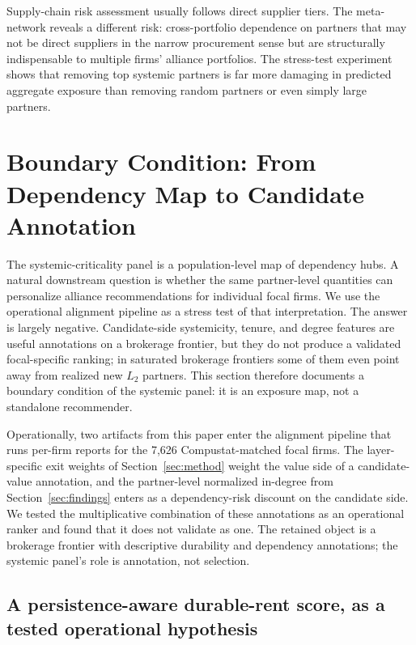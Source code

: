 \documentclass[11pt,letterpaper]{article}
\begin{document}
Supply-chain risk assessment usually follows direct supplier tiers.
The meta-network reveals a different risk: cross-portfolio dependence
on partners that may not be direct suppliers in the narrow procurement
sense but are structurally indispensable to multiple firms' alliance
portfolios.  The stress-test experiment shows that removing top
systemic partners is far more damaging in predicted aggregate exposure
than removing random partners or even simply large partners.

\section{Boundary Condition: From Dependency Map to Candidate Annotation}
\label{sec:downstream}

The systemic-criticality panel is a population-level map of
dependency hubs.  A natural downstream question is whether the same
partner-level quantities can personalize alliance recommendations
for individual focal firms.  We use the operational alignment
pipeline as a stress test of that interpretation.  The answer is
largely negative.  Candidate-side systemicity, tenure, and degree
features are useful annotations on a brokerage frontier, but they
do not produce a validated focal-specific ranking; in saturated
brokerage frontiers some of them even point away from realized new
$L_2$ partners.  This section therefore documents a boundary
condition of the systemic panel: it is an exposure map, not a
standalone recommender.

Operationally, two artifacts from this paper enter the alignment
pipeline that runs per-firm reports for the 7{,}626 Compustat-matched
focal firms.  The layer-specific exit weights of
Section~\ref{sec:method} weight the value side of a candidate-value
annotation, and the partner-level normalized in-degree from
Section~\ref{sec:findings} enters as a dependency-risk discount on
the candidate side.  We tested the multiplicative combination of
these annotations as an operational ranker and found that it does
not validate as one.  The retained object is a brokerage frontier
with descriptive durability and dependency annotations; the
systemic panel's role is annotation, not selection.

\subsection{A persistence-aware durable-rent score, as a tested
            operational hypothesis}
\end{document}
